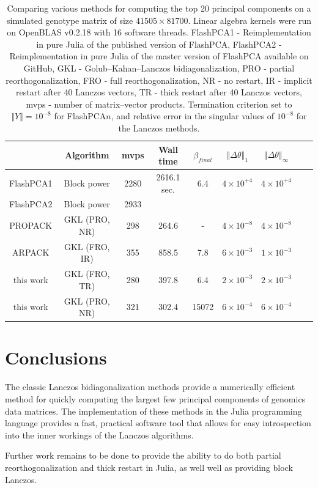 \documentclass[review]{siamart0516}
\begin{document}
\begin{table}
\begin{tabular}{|c|c|c|c|c|c|c|c|c|}
\hline
 & Algorithm & mvps & Wall time & $\beta_{final}$ & $\left\Vert \Delta\theta\right\Vert _{1}$ & $\left\Vert \Delta\theta\right\Vert _{\infty}$\tabularnewline
\hline
\hline
FlashPCA1 & Block power & 2280 & 2616.1 sec. & 6.4 & $4\times10^{+4}$ & $4\times10^{+4}$\tabularnewline
\hline
FlashPCA2 & Block power & 2933 &  &  &  & \tabularnewline
\hline
PROPACK & GKL (PRO, NR) & 298 & 264.6 & - & $4\times10^{-8}$ & $4\times10^{-8}$\tabularnewline
\hline
ARPACK & GKL (FRO, IR) & 355 & 858.5 & 7.8 & $6\times10^{-3}$ & $1\times10^{-3}$\tabularnewline
\hline
this work & GKL (FRO, TR) & 280 & 397.8 & 6.4 & $2\times10^{-3}$ & $2\times10^{-3}$\tabularnewline
\hline
this work & GKL (PRO, NR) & 321 & 302.4 & 15072 & $6\times10^{-4}$ & $6\times10^{-4}$\tabularnewline
\hline
\end{tabular}

\caption{Comparing various methods for computing the top 20 principal
components on a simulated genotype matrix of size $41505\times81700$.
Linear algebra kernels were run on OpenBLAS v0.2.18 with 16 software threads.
FlashPCA1 - Reimplementation in pure Julia of the published version of FlashPCA,
FlashPCA2 - Reimplementation in pure Julia of the master version of FlashPCA available on GitHub,
GKL - Golub--Kahan--Lanczos bidiagonalization,
PRO - partial reorthogonalization,
FRO - full reorthogonalization,
NR - no restart,
IR - implicit restart after 40 Lanczos vectors,
TR - thick restart after 40 Lanczos vectors,
mvps - number of matrix--vector products.
Termination criterion set to $\Vert Y\Vert = 10^{-8}$ for FlashPCA$n$,
and relative error in the singular values of $10^{-8}$ for the Lanczos methods.
}
\end{table}


\section{Conclusions}

The classic Lanczos bidiagonalization methods provide a numerically efficient
method for quickly computing the largest few principal components of genomics
data matrices. The implementation of these methods in the Julia programming
language provides a fast, practical software tool that allows for easy
introspection into the inner workings of the Lanczos algorithms.

Further work remains to be done to provide the ability to do both partial
reorthogonalization and thick restart in Julia, as well well as providing
block Lanczos.
\end{document}
